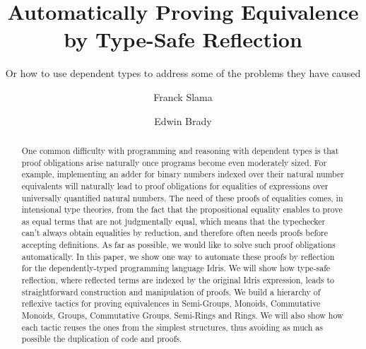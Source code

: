 \documentclass{llncs}
\begin{document}
%
\pagestyle{headings}  %

\mainmatter              %
%
\title{Automatically Proving Equivalence by Type-Safe Reflection}
\subtitle{Or how to use dependent types to address some of the problems they have caused}
%
%
\author{Franck Slama \and Edwin Brady}

\maketitle              %

\begin{abstract}
One common difficulty with programming and reasoning with dependent types is that proof obligations arise naturally once programs become even moderately sized. For example, implementing an adder for binary numbers indexed over their natural number equivalents will naturally lead to proof obligations for equalities of expressions over universally quantified natural numbers. The need of these proofs of equalities comes, in intensional type theories, from the fact that the propositional equality enables to prove as equal terms that are not judgmentally equal, which means that the typechecker can't always obtain equalities by reduction, and therefore often needs proofs before accepting definitions.
As far as possible, we would like to solve such proof obligations automatically. In this paper, we show one way to automate these proofs by reflection for the dependently-typed programming language Idris. We will show how type-safe reflection, where reflected terms are indexed by the original Idris expression, leads to straightforward construction and manipulation of proofs. We build a hierarchy of reflexive tactics for proving equivalences in Semi-Groups, Monoids, Commutative Monoids, Groups, Commutative Groups, Semi-Rings and Rings. We will also show how each tactic reuses the ones from the simplest structures, thus avoiding as much as possible the duplication of code and proofs.


\end{abstract}
%












\end{document}
